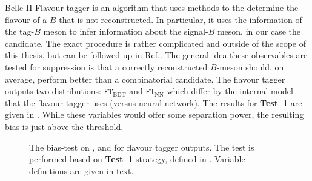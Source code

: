 Belle II Flavour tagger is an algorithm that uses \MVA methods to the determine the flavour of a $B$ that is not reconstructed.
In particular, it uses the information of the tag-$B$ meson to infer information about the signal-$B$ meson, in our case the \BtoXsgamma candidate.
The exact procedure is rather complicated and outside of the scope of this thesis, but can be followed up in Ref.\cite{Belle-II:2021zvj}.
The general idea these observables are tested for \epem\ra\qqbar suppression is that a correctly reconstructed $B$-meson should, on average, perform better than a combinatorial \qqbar candidate.
The flavour tagger outputs two distributions: $\mathtt{FT}_{\mathrm{BDT}}$ and $\mathtt{FT}_{\mathrm{NN}}$ which differ by the internal model that the flavour tagger uses (\BDT versus neural network).
The results for \textbf{Test~1} are given in .
While these variables would offer some separation power, the resulting bias is just above the threshold.

\begin{figure}[htbp!]

    \caption{\label{fig:flavour_tagger_outputs} The bias-test on \EB, \Estar and \Mbc for flavour tagger outputs.
    The test is performed based on \textbf{Test~1} strategy, defined in .
    Variable definitions are given in text.}
\end{figure}
